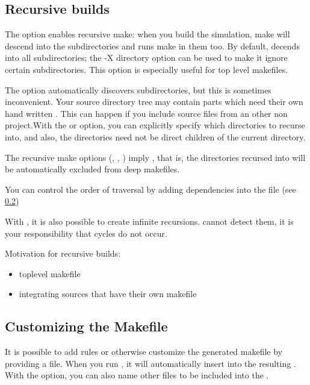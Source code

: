 \subsection{Recursive builds}


The  option enables recursive make: when you build the simulation, make
will descend into the subdirectories and runs make in them too.
By default,  decends into all subdirectories; the -X directory option
can be used to make it ignore certain subdirectories. This option is especially useful
for top level makefiles.


The  option automatically discovers subdirectories, but this
is sometimes inconvenient. Your source directory tree may contain
parts which need their own hand written . This can happen if
you include source files from an other non {\opp} project.With the 
or  option, you can explicitly specify which directories to
recurse into, and also, the directories need not be direct children of the
current directory.


The recursive make options (, , )
imply , that is, the directories recursed into will be
automatically excluded from deep makefiles.


You can control the order of traversal by adding dependencies into
the  file (see \ref{sec:makefrag})

\begin{note}
With , it is also possible to create infinite recursions.
 cannot detect them, it is your responsibility that
cycles do not occur.
\end{note}


Motivation for recursive builds:
\begin{itemize}
 \item{toplevel makefile}
 \item{integrating sources that have their own makefile}
\end{itemize}


\subsection{Customizing the Makefile}
\label{sec:makefrag}

It is possible to add rules or otherwise customize the generated makefile
by providing a  file. When you run , it
will automatically insert  into the resulting .
With the  option, you can also name other files to be included into the
.

